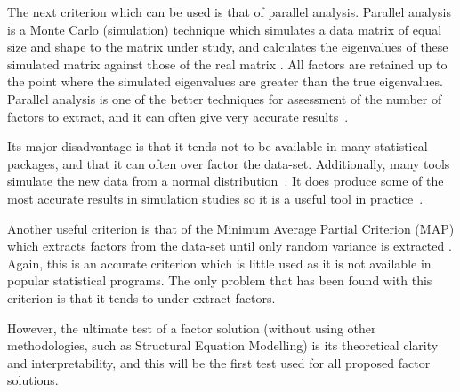 The next criterion which can be used is that of parallel analysis. Parallel analysis is a Monte Carlo (simulation)  technique which simulates a data matrix of equal size and shape to the matrix under study, and calculates the eigenvalues of these simulated matrix against those of the real matrix \cite{horn1965rationale}. All factors are retained up to the point where the simulated eigenvalues are greater than the true eigenvalues.  Parallel analysis is one of the better techniques for assessment of the number of factors to extract, and it can often give very accurate results~\cite{zwick1986comparison}.

Its major disadvantage is that it tends not to be available in many statistical packages, and that it can often over factor the data-set. Additionally, many tools simulate the new data from a normal distribution~\cite{micceri1989unicorn}.  It does produce some of the most accurate results in simulation studies so it is a useful tool in practice~\cite{zwick1986comparison}. 

Another useful criterion is that of the Minimum Average Partial Criterion (MAP) which extracts factors from the data-set until only random variance is extracted \cite{revelle1979very}. Again, this is an accurate criterion  \cite{zwick1986comparison} which is little used as it is not available in popular statistical programs. The only problem that  has been found with this criterion is that it tends to under-extract factors. %

However, the ultimate test of a factor solution (without using other methodologies, such as Structural Equation Modelling) \cite{joreskog1978structural} is its theoretical clarity and interpretability, and this will be the first test used for all proposed factor solutions.

